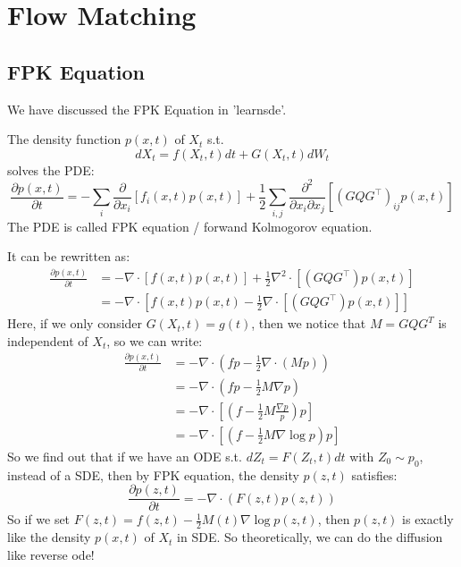 \section{Flow Matching}
\subsection{FPK Equation}
We have discussed the FPK Equation in 'learnsde'. 
\begin{theorem}
    The density function $p(x, t)$ of $X_t$ s.t. 
    \begin{equation}
        dX_t = f(X_t, t)dt + G(X_t,t)dW_t
    \end{equation}
    solves the PDE:
    \begin{equation}
        \frac{\partial p(x, t)}{\partial t}=-\sum_{i} \frac{\partial}{\partial x_{i}}\left[f_{i}(x, t) p(x, t)\right]+\frac{1}{2} \sum_{i, j} \frac{\partial^{2}}{\partial x_{i} \partial x_{j}}\left[\left(G Q G^{\top}\right)_{i j} p(x, t)\right]
    \end{equation}
    The PDE is called FPK equation / forwand Kolmogorov equation.
\end{theorem}
It can be rewritten as:
\begin{equation}
    \begin{aligned}
        \frac{\partial p(x, t)}{\partial t} &= -\nabla\cdot\left[f(x, t) p(x, t)\right]+\frac{1}{2} \nabla^2\cdot\left[\left(G Q G^{\top}\right) p(x, t)\right] \\
        &=-\nabla\cdot\left[f(x, t) p(x, t)-\frac{1}{2} \nabla\cdot\left[\left(G Q G^{\top}\right) p(x, t)\right]\right]
    \end{aligned}
\end{equation}
Here, if we only consider $G(X_t, t)=g(t)$, then we notice that $M=GQG^T$ is independent of $X_t$, so we can write:
\begin{equation}
    \begin{aligned}
        \frac{\partial p(x, t)}{\partial t} &= -\nabla\cdot\left(fp-\frac{1}{2}\nabla\cdot (Mp)\right)\\
        &=-\nabla\cdot\left(fp-\frac{1}{2}M\nabla p\right)\\
        &=-\nabla\cdot\left[\left(f-\frac{1}{2}M\frac{\nabla p}{p}\right)p\right]\\
        &=-\nabla\cdot\left[\left(f-\frac{1}{2}M\nabla\log p\right)p\right]
    \end{aligned}
\end{equation}
So we find out that if we have an ODE s.t. $dZ_t=F(Z_t, t)dt$ with $Z_0 \sim p_0$, instead of a SDE, then by FPK equation, the density $p(z, t)$ satisfies:
\begin{equation}
    \frac{\partial p(z, t)}{\partial t}=-\nabla\cdot\left(F(z, t)p(z, t)\right)
\end{equation}
So if we set $F(z, t)=f(z, t) - \frac{1}{2}M(t)\nabla\log p(z, t)$, then $p(z, t)$ is exactly like the density $p(x, t)$ of $X_t$ in SDE. 
So theoretically, we can do the diffusion like reverse ode!

